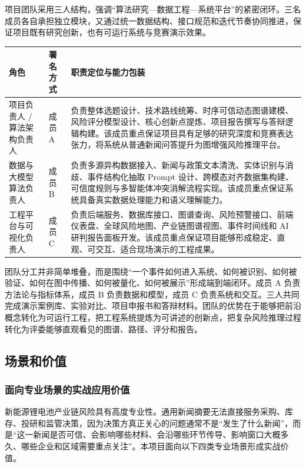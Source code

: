 \documentclass[12pt,a4paper]{article}
\begin{document}
项目团队采用三人结构，强调“算法研究—数据工程—系统平台”的紧密闭环。三名成员各自承担独立模块，又通过统一数据结构、接口规范和迭代节奏协同推进，保证项目既有研究创新，也有可运行系统与竞赛演示效果。

\begin{longtable}{p{}p{}p{}}
\toprule
\textbf{角色} & \textbf{署名方式} & \textbf{职责定位与能力包装} \\
\midrule
项目负责人 / 算法架构负责人 & 成员A & 负责整体选题设计、技术路线统筹、时序可信动态图谱建模、风险评分模型设计、核心创新点提炼、项目报告撰写与答辩逻辑构建。该成员重点保证项目具有足够的研究深度和竞赛表达张力，将系统从普通新闻问答提升为图增强风险推理平台。 \\
\midrule
数据与大模型算法负责人 & 成员B & 负责多源异构数据接入、新闻与政策文本清洗、实体识别与消歧、事件结构化抽取 Prompt 设计、跨模态对齐数据集构建、可信度规则与多智能体冲突消解流程实现。该成员重点保证系统具备真实数据处理能力和语义理解能力。 \\
\midrule
工程平台与可视化负责人 & 成员C & 负责后端服务、数据库接口、图谱查询、风险预警接口、前端仪表盘、全球风险地图、产业链图谱视图、事件时间线和 AI 研判报告面板开发。该成员重点保证项目能够形成稳定、直观、可交互、适合现场演示的工程成果。 \\
\bottomrule
\end{longtable}

团队分工并非简单堆叠，而是围绕“一个事件如何进入系统、如何被识别、如何被验证、如何在图中传播、如何被量化、如何被展示”形成端到端闭环。成员 A 负责方法论与指标体系，成员 B 负责数据和模型，成员 C 负责系统和交互。三人共同完成演示案例库、实验对比、项目申报书和答辩材料。团队的优势在于能够把前沿概念转化为可运行工程，把工程系统提炼为可讲述的创新点，把复杂风险推理过程转化为评委能够直观看见的图谱、路径、评分和报告。

\subsection{场景和价值}

\subsubsection{面向专业场景的实战应用价值}

新能源锂电池产业链风险具有高度专业性。通用新闻摘要无法直接服务采购、库存、投研和监管决策，因为决策方真正关心的问题通常不是“发生了什么新闻”，而是“这一新闻是否可信、会影响哪些材料、会沿哪些环节传导、影响窗口大概多久、哪些企业和区域需要重点关注”。本项目面向以下四类专业场景形成实战价值。
\end{document}
